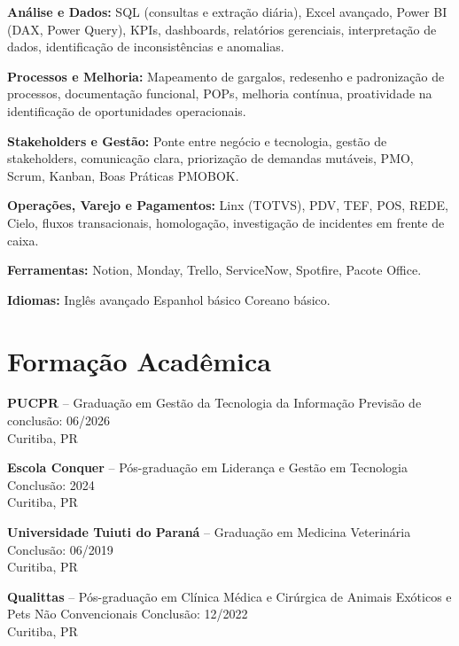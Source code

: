 \documentclass[11pt,a4paper]{article}
\begin{document}
\textbf{Análise e Dados:} SQL (consultas e extração diária), Excel avançado, Power BI (DAX, Power Query), KPIs, dashboards, relatórios gerenciais, interpretação de dados, identificação de inconsistências e anomalias.

\textbf{Processos e Melhoria:} Mapeamento de gargalos, redesenho e padronização de processos, documentação funcional, POPs, melhoria contínua, proatividade na identificação de oportunidades operacionais.

\textbf{Stakeholders e Gestão:} Ponte entre negócio e tecnologia, gestão de stakeholders, comunicação clara, priorização de demandas mutáveis, PMO, Scrum, Kanban, Boas Práticas PMOBOK.

\textbf{Operações, Varejo e Pagamentos:} Linx (TOTVS), PDV, TEF, POS, REDE, Cielo, fluxos transacionais, homologação, investigação de incidentes em frente de caixa.

\textbf{Ferramentas:} Notion, Monday, Trello, ServiceNow, Spotfire, Pacote Office.

\textbf{Idiomas:} Inglês avançado \textbullet{} Espanhol básico \textbullet{} Coreano básico.

\section*{Formação Acadêmica}

\textbf{PUCPR} -- Graduação em Gestão da Tecnologia da Informação \hfill Previsão de conclusão: 06/2026\\
Curitiba, PR

\textbf{Escola Conquer} -- Pós-graduação em Liderança e Gestão em Tecnologia \hfill Conclusão: 2024\\
Curitiba, PR

\textbf{Universidade Tuiuti do Paraná} -- Graduação em Medicina Veterinária \hfill Conclusão: 06/2019\\
Curitiba, PR

\textbf{Qualittas} -- Pós-graduação em Clínica Médica e Cirúrgica de Animais Exóticos e Pets Não Convencionais \hfill Conclusão: 12/2022\\
Curitiba, PR
\end{document}
